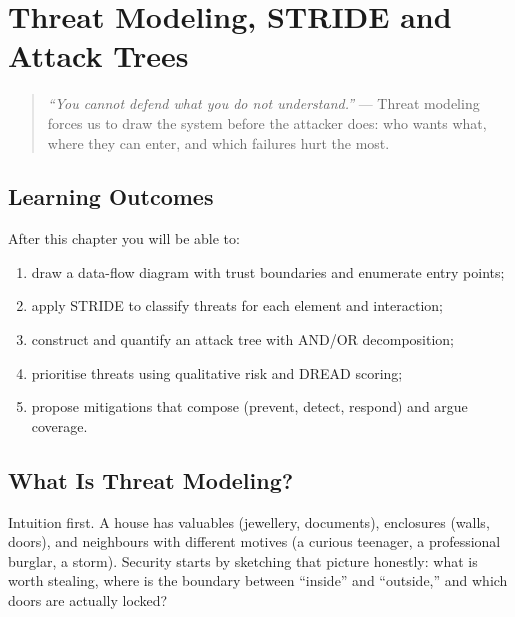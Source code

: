 \chapter{Threat Modeling, STRIDE and Attack Trees}
\label{ch:threat}

\begin{quote}
\emph{``You cannot defend what you do not understand.''} --- Threat modeling forces us to draw the system before the attacker does: who wants what, where they can enter, and which failures hurt the most.
\end{quote}

\noindent{}
\vspace{0.4em}

\section*{Learning Outcomes}
After this chapter you will be able to:
\begin{enumerate}[label=(L\arabic*)]
    \item draw a data-flow diagram with trust boundaries and enumerate entry points;
    \item apply STRIDE to classify threats for each element and interaction;
    \item construct and quantify an attack tree with AND/OR decomposition;
    \item prioritise threats using qualitative risk and DREAD scoring;
    \item propose mitigations that compose (prevent, detect, respond) and argue coverage.
\end{enumerate}

\section{What Is Threat Modeling?}
\label{sec:what-is-tm}
Intuition first. A house has valuables (jewellery, documents), enclosures (walls, doors), and neighbours with different motives (a curious teenager, a professional burglar, a storm). Security starts by sketching that picture honestly: what is worth stealing, where is the boundary between ``inside'' and ``outside,'' and which doors are actually locked?

